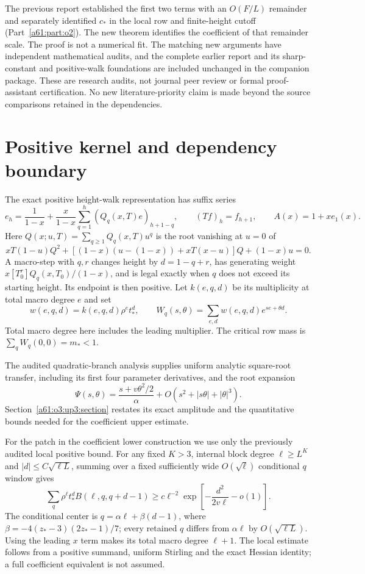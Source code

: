 \documentclass[11pt,letterpaper]{article}
\numberwithin{equation}{section}
\theoremstyle{remark}\newtheorem{remark}[theorem]{Remark}
\begin{document}
The previous report established the first two terms with an $O(F/L)$
remainder and separately identified $c_*$ in the local row and
finite-height cutoff (Part~\ref{a61:part:o2}). The new theorem identifies the
coefficient of that remainder scale. The proof is not a numerical fit.
The matching new arguments have independent mathematical audits, and
the complete earlier report and its sharp-constant and positive-walk
foundations are included unchanged in the companion package.
These are research audits, not journal peer review or formal
proof-assistant certification. No new literature-priority claim is
made beyond the source comparisons retained in the dependencies.

\section{Positive kernel and dependency boundary}
The exact positive height-walk representation has suffix series
\[
 e_h=\frac1{1-x}+\frac{x}{1-x}\sum_{q=1}^h(Q_q(x,T)e)_{h+1-q},
 \qquad (Tf)_h=f_{h+1},\qquad A(x)=1+xe_1(x).
\]
Here $Q(x;u,T)=\sum_{q\ge1}Q_q(x,T)u^q$ is the root vanishing at
$u=0$ of
\[
 xT(1-u)Q^2+[(1-x)(u-(1-x))+xT(x-u)]Q+(1-x)u=0.
\]
A macro-step with $q,r$ changes height by $d=1-q+r$, has generating
weight $x[T_0^r]Q_q(x,T_0)/(1-x)$, and is legal exactly when $q$ does
not exceed its starting height. Its endpoint is then positive.
Let $k(e,q,d)$ be its multiplicity at total macro degree $e$ and set
\[
 w(e,q,d)=k(e,q,d)\rho^e t_*^d,
 \qquad W_q(s,\theta)=\sum_{e,d}w(e,q,d)e^{se+\theta d}.
\]
Total macro degree here includes the leading multiplier.
The critical row mass is $\sum_qW_q(0,0)=m_*<1$.

The audited quadratic-branch analysis supplies uniform analytic
square-root transfer, including its first four parameter derivatives,
and the root expansion
\[
 \Psi(s,\theta)
 =\frac{s+v\theta^2/2}{\alpha}
      +O(s^2+|s\theta|+|\theta|^3).
\]
Section~\ref{a61:o3:up3:section} restates its exact amplitude and the
quantitative bounds needed for the coefficient upper estimate.

For the patch in the coefficient lower construction we use only the
previously audited local positive bound. For any fixed $K>3$, internal
block degree $\ell\ge L^K$ and $|d|\le C\sqrt{\ell L}$, summing over
a fixed sufficiently wide $O(\sqrt\ell)$ conditional $q$ window gives
\begin{equation}\label{a61:o3:eq:local-kernel}
 \sum_q\rho^\ell t_*^d B(\ell,q,q+d-1)
 \ge c\ell^{-2}\exp\left[-\frac{d^2}{2v\ell}-o(1)\right].
\end{equation}
The conditional center is
$q=\alpha\ell+\beta(d-1)$, where
$\beta=-4(z_*-3)(2z_*-1)/7$; every retained $q$ differs from
$\alpha\ell$ by $O(\sqrt{\ell L})$.
Using the leading $x$ term makes its total macro degree $\ell+1$.
The local estimate follows from a positive summand, uniform Stirling
and the exact Hessian identity; a full coefficient equivalent is not
assumed.
\end{document}
